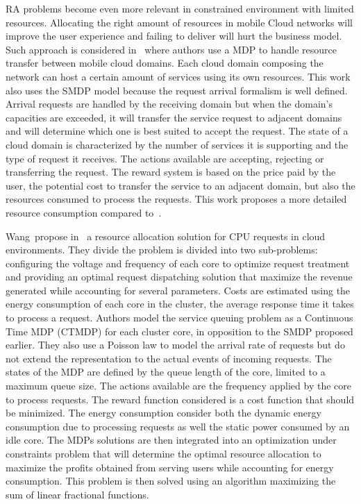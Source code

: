 RA problems become even more relevant in constrained environment with limited resources.
Allocating the right amount of resources in mobile Cloud networks will improve the user experience and failing to deliver will hurt the business model.
Such approach is considered in~\cite{Liang2012} where authors use a MDP to handle resource transfer between mobile cloud domains. Each cloud domain composing the network can host a certain amount of services using its own resources. 
This work also uses the SMDP model because the request arrival formalism is well defined.
Arrival requests are handled by the receiving domain but when the domain's capacities are exceeded, it will transfer the service request to adjacent domains and will determine which one is best suited to accept the request.
The state of a cloud domain is characterized by the number of services it is supporting and the type of request it receives.
The actions available are accepting, rejecting or transferring the request.
The reward system is based on the price paid by the user, the potential cost to transfer the service to an adjacent domain, but also the resources consumed to process the requests. 
This work proposes a more detailed resource consumption compared to~\cite{Liang2011}.

Wang~\etal propose in~\cite{Wang2013} a resource allocation solution for CPU requests in cloud environments.
They divide the problem is divided into two sub-problems: configuring the voltage and frequency of each core to optimize request treatment and providing an optimal request dispatching solution that maximize the revenue generated while accounting for several parameters.
Costs are estimated using the energy consumption of each core in the cluster, the average response time it takes to process a request.
Authors model the service queuing problem as a Continuous Time MDP (CTMDP) for each cluster core, in opposition to the SMDP proposed earlier.
They also use a Poisson law to model the arrival rate of requests but do not extend the representation to the actual events of incoming requests.
The states of the MDP are defined by the queue length of the core, limited to a maximum queue size. The actions available are the frequency applied by the core to process requests.
The reward function considered is a cost function that should be minimized.
The energy consumption consider both the dynamic energy consumption due to processing requests as well the static power consumed by an idle core.
The MDPs solutions are then integrated into an optimization under constraints problem that will determine the optimal resource allocation to maximize the profits obtained from serving users while accounting for energy consumption.
This problem is then solved using an algorithm maximizing the sum of linear fractional functions.


